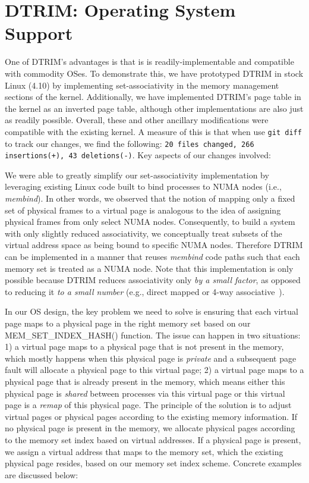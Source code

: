 \section{DTRIM: Operating System Support}
\label{sec:os}

One of DTRIM's advantages is that is is readily-implementable and
compatible with commodity OSes. To demonstrate this, we have
prototyped DTRIM in stock Linux (4.10) by implementing set-associativity in
the memory management sections of the kernel. Additionally, we have
implemented DTRIM's page table in the kernel as an inverted page table,
although other implementations are also just as readily possible. 
Overall, these and other ancillary
modifications were compatible with the existing kernel. A measure of
this is that when use \verb|git diff| to track our changes, we find
the following: \texttt{20 files changed, 266 insertions(+), 43
  deletions(-)}. Key aspects of our changes involved:

\vspace{2mm}
 We were
able to greatly simplify our set-associativity implementation by
leveraging existing Linux code built to bind processes to NUMA nodes
(i.e., {\it membind}). In other words, we observed that the notion of
mapping only a fixed set of physical frames to a virtual page is
analogous to the idea of assigning physical frames from only select
NUMA nodes. Consequently, to build a system with only slightly reduced associativity, 
we conceptually treat subsets of the virtual address space as being bound to specific
NUMA nodes. Therefore DTRIM can be implemented in a manner that
reuses {\it membind} code paths such that each memory set is treated
as a NUMA node. Note that this implementation is only possible because DTRIM
reduces associativity only \textit{by a small factor}, as opposed to reducing it
\textit{to a small number} (e.g., direct mapped or 4-way associative~\cite{picorel:near-memory}). 


\vspace{2mm}
 In our OS design, 
the key problem we need to solve is ensuring that each virtual page 
maps to a physical page in the right memory set based on our MEM\_SET\_INDEX\_HASH() function. 
The issue can happen in two situations: 1) a virtual page maps to a 
physical page that is not present in the memory, which mostly happens
when this physical page is \textit{private} and a subsequent
page fault will allocate a physical page to this virtual page; 
2) a virtual page maps to a physical page that is already present in the memory,
which means either this physical page is \textit{shared} between processes via this
virtual page or this virtual page is a \textit{remap} of this physical page.
The principle of the solution is to adjust virtual pages or physical pages 
according to the existing memory information. If no physical page is present 
in the memory, we allocate physical pages according to the memory set index 
based on virtual addresses. If a physical page is present, we assign a virtual 
address that maps to the memory set, which the existing physical page 
resides, based on our memory set index scheme. Concrete examples are discussed below:

